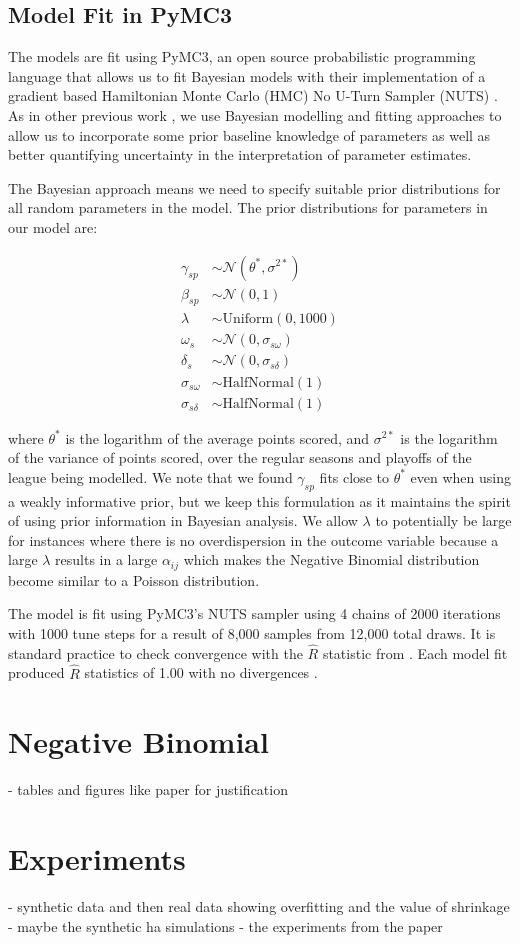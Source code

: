 \subsection*{Model Fit in PyMC3}

The models are fit using PyMC3, an open source probabilistic programming language that allows us to fit Bayesian models with their implementation of a gradient based Hamiltonian Monte Carlo (HMC) No U-Turn Sampler (NUTS) \cite{pymc3}. As in other previous work \cite{Baio2010} \cite{Benz2020}, we use Bayesian modelling and fitting approaches to allow us to incorporate some prior baseline knowledge of parameters as well as better quantifying uncertainty in the interpretation of parameter estimates.

The Bayesian approach means we need to specify suitable prior distributions for all random parameters in the model. The prior distributions for parameters in our model are:

\begin{equation}
\begin{split}
\gamma_{sp} &\sim \mathcal{N}(\theta^*, \sigma^{2*}) \\
\beta_{sp} &\sim \mathcal{N}(0, 1) \\
\lambda &\sim \text{Uniform}(0, 1000) \\
\omega_s &\sim \mathcal{N}(0, \sigma_{s\omega}) \\
\delta_s &\sim \mathcal{N}(0, \sigma_{s\delta}) \\
\sigma_{s\omega} &\sim \text{HalfNormal}(1) \\
\sigma_{s\delta} &\sim \text{HalfNormal}(1)
\end{split}
\end{equation}

where \(\theta^*\) is the logarithm of the average points scored, and \(\sigma^{2*}\) is the logarithm of the variance of points scored, over the regular seasons and playoffs of the league being modelled. We note that we found \(\gamma_{sp}\) fits close to \(\theta^*\) even when using a weakly informative prior, but we keep this formulation as it maintains the spirit of using prior information in Bayesian analysis. We allow \(\lambda\) to potentially be large for instances where there is no overdispersion in the outcome variable because a large \(\lambda\) results in a large \(\alpha_{ij}\) which makes the Negative Binomial distribution become similar to a Poisson distribution.

The model is fit using PyMC3's NUTS sampler using 4 chains of 2000 iterations with 1000 tune steps for a result of 8,000 samples from 12,000 total draws. It is standard practice to check convergence with the \(\hat{R}\) statistic from \cite{Gelman1992} \cite{Brooks1997}.  Each model fit produced \(\hat{R}\) statistics of 1.00 with no divergences \cite{Betancourt2017}.

\section{Negative Binomial}

- tables and figures like paper for justification

\section{Experiments}

- synthetic data and then real data showing overfitting and the value of shrinkage
- maybe the synthetic ha simulations
- the experiments from the paper
